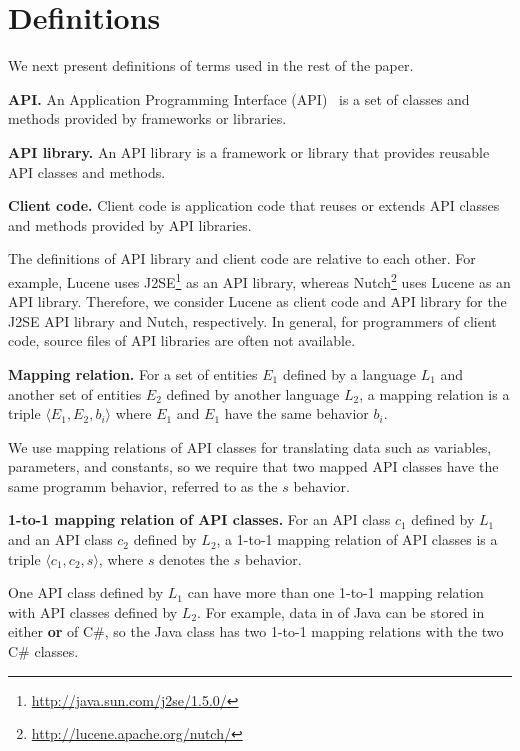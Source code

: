 \section{Definitions}
\label{sec:mapping}

We next present definitions of terms used in the rest of the paper.

\textbf{API.} An Application Programming Interface (API)~\cite{orenstein2000quickstudy}
is a set of classes and methods provided by frameworks or libraries.

\textbf{API library.} An API library is a framework
or library that provides reusable API classes and methods.

\textbf{Client code.} Client code is application code
that reuses or extends API classes and methods provided by API
libraries.

The definitions of API library and client code are
relative to each other. For example, Lucene uses
J2SE\footnote{\url{http://java.sun.com/j2se/1.5.0/}} as an API
library, whereas Nutch\footnote{\url{http://lucene.apache.org/nutch/}} uses Lucene as
an API library. Therefore, we consider Lucene as client code and API
library for the J2SE API library and Nutch, respectively. In
general, for programmers of client code, source files of API libraries are often
not available.

\textbf{Mapping relation.} For a set of entities $E_1$ defined by a
language $L_1$ and another set of entities $E_2$ defined by another
language $L_2$, a mapping relation is a triple $\langle E_1, E_2,
b_i \rangle$ where $E_1$ and $E_1$ have the same behavior $b_i$.


We use mapping relations of API classes for translating data such as
variables, parameters, and constants, so we require that two mapped
API classes have the same programm behavior, referred to as
the $s$ behavior.

\textbf{1-to-1 mapping relation of API classes.} For an API class
$c_1$ defined by $L_1$ and an API class $c_2$ defined by $L_2$, a
1-to-1 mapping relation of API classes is a triple $\langle c_1,
c_2, s \rangle$, where $s$ denotes the $s$ behavior.

One API class defined by $L_1$ can have more than one 1-to-1 mapping
relation with API classes defined by $L_2$. For example, data in
 of Java can be stored in either
 \textbf{or}
 of C\#, so the Java class
has two 1-to-1 mapping relations with the two C\# classes.

